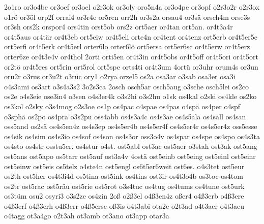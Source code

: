 {    2o1ro
    or3o4be
    or3oef
    or3oel
    o2r3ok
    or3oly
    oro5n4a
    or3o4pe
    or3opf
    o2r3o2r
    o2r3ox
    o1rö
    or3öl
    orp2f
    orrai4
    or3r4e
    or5ren
    orr2h
    or3s2a
    orsau4
    or3sä
    orsch4m
    orse3s
    or3sh
    ors2k
    orspor4
    ors4tin
    orst5ob
    ors2z
    ort5aer
    or4tan
    ort5an.
    or4t3a4r
    or4t5aus
    or4tär
    or4t3eb
    ort5eiw
    or4t5eli
    orte4n
    or4tent
    or4tenz
    ort5erb
    or4t5er5e
    ort5erfi
    or4t5erk
    or4t5erl
    orter6lo
    orter6lö
    ort5ersa
    ort5er6sc
    or4t5erw
    or4t5erz
    orter6ze
    or4t3e4v
    or4thol
    2orti
    orti5en
    or4t3in
    or4t5obs
    or4t5off
    or4t5ori
    or4t5ort
    or2tö
    or4t5res
    ort5rin
    ort5rol
    ort5spe
    orts4ti
    or4t3um
    4ortü
    or3uhr
    orum4s
    or3un
    oru2r
    o3rus
    or3u2t
    o3rüc
    ory1
    o2rya
    orzel5
    os2a
    osa3ar
    o3sab
    osa3er
    osa3i
    o4s3ami
    os3art
    o3s4a3s2
    3o2s3ca
    2osch
    osch5ar
    osch5aug
    o3sche
    osch5lei
    os2co
    os2e
    o4s3eie
    ose3in4
    o3sen
    o4s3er4k
    o3s2hi
    o3s2hu
    o1sk
    os4kal
    o2ski
    os4kle
    os2ko
    os3kol
    o2sky
    o3s4mog
    o2s3oe
    os1p
    os4pac
    o4spae
    os4pas
    o4spä
    os4per
    o4spf
    o3sphä
    os2po
    os4pra
    o3s2pu
    oss4abb
    os4s3a4c
    os4s3ae
    os4s5ala
    os4sall
    os4san
    oss5and
    os2sä
    os4s5en4z
    os4s3ep
    os4s5er4b
    os4s5er4f
    os4s5er4r
    os4s5er4z
    oss5esse
    os4sik
    os4sim
    os4s3io
    os4sof
    os4son
    os4s3or
    oss3o4v
    os4spar
    os4spe
    os4spo
    os4s3ta
    os4sto
    os4str
    osstu5er.
    os4stur
    o4st.
    ost5abl
    ost3ac
    ost5aer
    o3stah
    ost3ak
    ost5ang
    ost5ans
    ost5apo
    os5tarr
    ost5auf
    ost3a4v
    4ostä
    ost5einb
    ost5eing
    ost5einl
    ost5einr
    ost5einw
    ost5eis
    os5telz
    o4ste4n
    ost5engl
    os6t5er6weit
    ost6es.
    o4s3tet
    ost5eur
    os2th
    ost5her
    os4t3i4d
    os5tina
    ost5ink
    os4tins
    ost3ir
    os4t3o4b
    os3toc
    os4tom
    os2tr
    ost5rac
    ost5räu
    ost5rie
    ost5rot
    o3s4tuc
    os4tug
    os4tums
    os4tune
    ost5urk
    os3tüm
    osu2
    osyri3
    o3s2ze
    os4zin
    2oß
    o2ß3el
    o4ß3en4z
    oßer4
    o4ß3erb
    o4ß3ere
    o4ß3erf
    o4ß3erh
    o4ß3err
    o4ß5ersc
    oß3is
    o4t3abi
    ota2c
    o2t3ad
    o4t3aer
    o4t3aeu
    o4tagg
    ot3a4go
    o2t3ah
    ot3amb
    ot3ano
    ot3app
    otar3a
}
